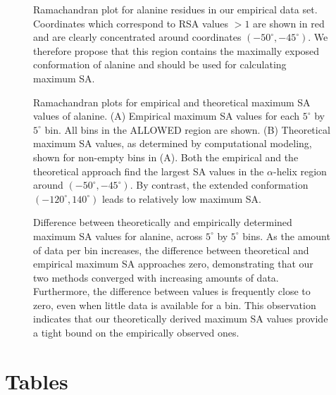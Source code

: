 \documentclass[11pt]{article}
\begin{document}
\begin{figure}[H]
\caption{\label{fig:RamaAla}Ramachandran plot for alanine residues in our empirical data set. Coordinates which correspond to RSA values $>1$ are shown in red and are clearly concentrated around coordinates $(-50^\circ,-45^\circ)$. We therefore propose that this region contains the maximally exposed conformation of alanine and should be used for calculating maximum SA.}
\end{figure}

\begin{figure}[H]
\caption{\label{fig:heatrama} Ramachandran plots for empirical and theoretical maximum SA values of alanine. (A) Empirical maximum SA values for each $5^\circ$ by $5^\circ$ bin. All bins in the ALLOWED region are shown. (B) Theoretical maximum SA values, as determined by computational modeling, shown for non-empty bins in (A). Both the empirical and the theoretical approach find the largest SA values in the $\alpha$-helix region around $(-50^\circ,-45^\circ)$. By contrast, the extended conformation $(-120^\circ, 140^\circ)$ leads to relatively low maximum SA.}
\end{figure}


\begin{figure}[H]
\caption{\label{fig:EvC} Difference between theoretically and empirically determined maximum SA values for alanine, across $5^\circ$ by $5^\circ$ bins. As the amount of data per bin increases, the difference between theoretical and empirical maximum SA approaches zero, demonstrating that our two methods converged with increasing amounts of data. Furthermore, the difference between values is frequently close to zero, even when little data is available for a bin. This observation indicates that our theoretically derived maximum SA values provide a tight bound on the empirically observed ones.}
\end{figure}

\cleardoublepage

\section*{Tables}
\end{document}

